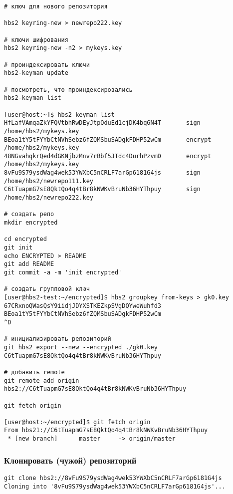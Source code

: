 \documentclass[11pt,a4paper]{article}
\begin{document}
\begin{verbatim}
# ключ для нового репозитория

hbs2 keyring-new > newrepo222.key

# ключи шифрования
hbs2 keyring-new -n2 > mykeys.key

# проиндексировать ключи
hbs2-keyman update

# посмотреть, что проиндексировались
hbs2-keyman list

[user@host:~]$ hbs2-keyman list
HfLafVAmqaZkYFQVtbhRwDEyJtpQduEd1cjDK4bq6N4T       sign       /home/hbs2/mykeys.key
BEoa1tY5tFYYbCtNVhSebz6fZQMSbuSADgkFDHP52wCm       encrypt    /home/hbs2/mykeys.key
48NGvahqkrQed4dGKNjbzMnv7rBbf5JTdc4DurhPzvmD       encrypt    /home/hbs2/mykeys.key
8vFu9S79ysdWag4wek53YWXbC5nCRLF7arGp6181G4js       sign       /home/hbs2/newrepo111.key
C6tTuapmG7sE8QktQo4q4tBr8kNWKvBruNb36HYThpuy       sign       /home/hbs2/newrepo222.key

# создать репо
mkdir encrypted

cd encrypted
git init
echo ENCRYPTED > README
git add README
git commit -a -m 'init encrypted'

# создать групповой ключ
[user@hbs2-test:~/encrypted]$ hbs2 groupkey from-keys > gk0.key
67CRxnoQWasQsY9iidjJDYXSTKEZkpSVgDQYweWuhfd3
BEoa1tY5tFYYbCtNVhSebz6fZQMSbuSADgkFDHP52wCm
^D

# инициализировать репозиторий
git hbs2 export --new --encrypted ./gk0.key  C6tTuapmG7sE8QktQo4q4tBr8kNWKvBruNb36HYThpuy

# добавить remote
git remote add origin hbs2://C6tTuapmG7sE8QktQo4q4tBr8kNWKvBruNb36HYThpuy

git fetch origin

[user@host:~/encrypted]$ git fetch origin
From hbs21://C6tTuapmG7sE8QktQo4q4tBr8kNWKvBruNb36HYThpuy
 * [new branch]      master     -> origin/master

\end{verbatim}


\subsubsection{Клонировать (чужой) репозиторий}

\begin{verbatim}
git clone hbs2://8vFu9S79ysdWag4wek53YWXbC5nCRLF7arGp6181G4js
Cloning into '8vFu9S79ysdWag4wek53YWXbC5nCRLF7arGp6181G4js'...

\end{verbatim}
\end{document}
